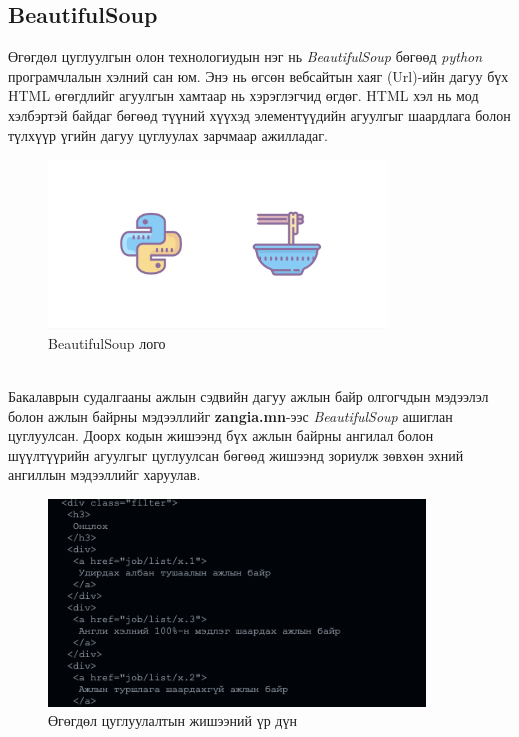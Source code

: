 \subsection{BeautifulSoup}
Өгөгдөл цуглуулгын олон технологиудын нэг нь \textit{BeautifulSoup} бөгөөд \textit{python} програмчлалын хэлний сан юм. Энэ нь өгсөн вебсайтын хаяг (Url)-ийн дагуу бүх HTML өгөгдлийг агуулгын хамтаар нь хэрэглэгчид өгдөг. HTML хэл нь мод хэлбэртэй байдаг бөгөөд түүний хүүхэд элементүүдийн агуулгыг шаардлага болон түлхүүр үгийн дагуу цуглуулах зарчмаар ажилладаг. 
\begin{figure}[ht]
	\centering
  \includegraphics[height=4.5cm]{images/bs4.png}
	\caption{BeautifulSoup лого}
  \label{fig:bsLogo}
\end{figure}
\\Бакалаврын судалгааны ажлын сэдвийн дагуу ажлын байр олгогчдын мэдээлэл болон ажлын байрны мэдээллийг \textbf{zangia.mn}-ээс \textit{BeautifulSoup} ашиглан цуглуулсан. Доорх кодын жишээнд бүх ажлын байрны ангилал болон шүүлтүүрийн агуулгыг цуглуулсан бөгөөд жишээнд зориулж зөвхөн эхний ангиллын мэдээллийг харуулав.

\begin{figure}[ht]
  \centering
  \includegraphics[height=5.5cm]{images/bsExample.png}
	\caption{Өгөгдөл цуглуулалтын жишээний үр дүн}
  \label{fig:resultBS}
\end{figure}
